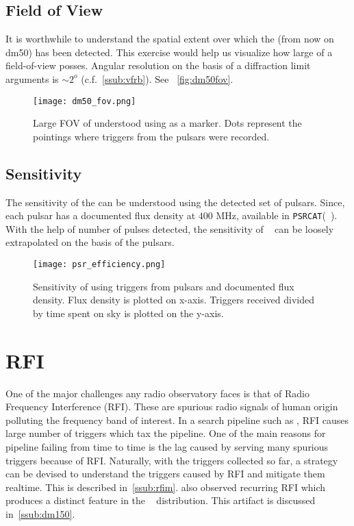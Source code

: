 \subsection{Field of View}
\label{ssub:fov}

\par It is worthwhile to understand the spatial extent over which the  (from now on dm50) has been detected. 
This exercise would help us visualize how large of a field-of-view \vf posses.
Angular resolution on the basis of a diffraction limit arguments is $\sim 2^o$ (c.f.~\autoref{ssub:vfrb}).
See ~\autoref{fig:dm50fov}. 
\begin{figure}
	\label{fig:dm50fov}
	\texttt{[image: dm50\_fov.png]}
	\caption{Large FOV of \vf understood using  as a marker. 
	Dots represent the pointings where triggers from the pulsars were recorded.
}
\end{figure}

\subsection {Sensitivity}
\label{ssub:sensitiviy}

\par The sensitivity of the \vf can be understood using the detected set of pulsars.
Since, each pulsar has a documented flux density at $400$ MHz, available in \texttt{PSRCAT}(~\cite{psrcat}).
With the help of number of pulses detected, the sensitivity of \vf~ can be loosely extrapolated on the basis of the pulsars.

\begin{figure}
	\label{fig:psrs400}
	\texttt{[image: psr\_efficiency.png]}
	\caption{Sensitivity of \vf using triggers from pulsars and documented flux density. 
		Flux density is plotted on x-axis. Triggers received divided by time spent on sky is plotted on the y-axis.
	}
\end{figure}
\section {RFI}
\label{sec:RFI}

\par One of the major challenges any radio observatory faces is that of Radio Frequency Interference (RFI). 
These are spurious radio signals of human origin polluting the frequency band of interest. In a search pipeline such as \vf, 
RFI causes large number of triggers which tax the pipeline. 
One of the main reasons for \vf pipeline failing from time to time is the lag caused by serving many spurious triggers because of RFI.
Naturally, with the triggers collected so far, a strategy can be devised to understand the triggers caused by RFI and mitigate them realtime.
This is described in~\autoref{ssub:rfim}. \vfpfs also observed recurring RFI which produces a distinct feature in the \dm~ distribution. This artifact is discussed in~\autoref{ssub:dm150}.


